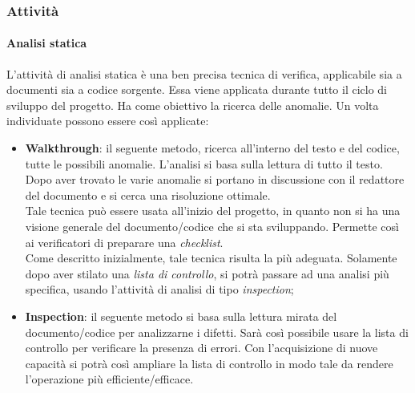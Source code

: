 		\subsubsection{Attività}

			\paragraph{Analisi statica} %
			\label{par:analisi_statica}
			L'attività di analisi statica è una ben precisa tecnica di verifica, applicabile sia a documenti sia a codice sorgente. Essa viene applicata durante tutto il ciclo di sviluppo del progetto. Ha come obiettivo la ricerca delle anomalie. Un volta individuate possono essere così applicate:
			\begin{itemize}
				\item \textbf{Walkthrough}: il seguente metodo, ricerca all'interno del testo e del codice, tutte le possibili anomalie. L'analisi si basa sulla lettura di tutto il testo.\\
				Dopo aver trovato le varie anomalie si portano in discussione con il redattore del documento e si cerca una risoluzione ottimale. \\
				Tale tecnica può essere usata all'inizio del progetto, in quanto non si ha una visione generale del documento/codice che si sta sviluppando. Permette così ai verificatori di preparare una \emph{checklist}.\\
				Come descritto inizialmente, tale tecnica risulta la più adeguata. Solamente dopo aver stilato una \emph{lista di controllo}, si potrà passare ad una analisi più specifica, usando l'attività di analisi di tipo \emph{inspection};
				\item \textbf{Inspection}: il seguente metodo si basa sulla lettura mirata del documento/codice per analizzarne i difetti. Sarà così possibile usare la lista di controllo per verificare la presenza di errori. Con l'acquisizione di nuove capacità si potrà così ampliare la lista di controllo in modo tale da rendere l'operazione più efficiente/efficace.
			\end{itemize}


